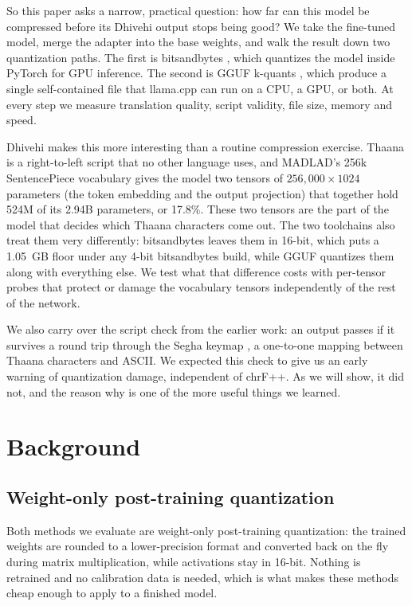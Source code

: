 \documentclass[10pt,twocolumn]{article}
\begin{document}
So this paper asks a narrow, practical question: how far can this model
be compressed before its Dhivehi output stops being good? We take the
fine-tuned model, merge the adapter into the base weights, and walk the
result down two quantization paths. The first is bitsandbytes
\citep{llmint8,qlora}, which quantizes the model inside PyTorch for GPU
inference. The second is GGUF k-quants \citep{llamacpp,kquants}, which
produce a single self-contained file that llama.cpp can run on a CPU, a
GPU, or both. At every step we measure translation quality, script
validity, file size, memory and speed.

Dhivehi makes this more interesting than a routine compression exercise.
Thaana is a right-to-left script that no other language uses, and
MADLAD's 256k SentencePiece vocabulary gives the model two tensors of
$256{,}000 \times 1024$ parameters (the token embedding and the output
projection) that together hold 524M of its 2.94B parameters, or 17.8\%.
These two tensors are the part of the model that decides which Thaana
characters come out. The two toolchains also treat them very
differently: bitsandbytes leaves them in 16-bit, which puts a 1.05~GB
floor under any 4-bit bitsandbytes build, while GGUF quantizes them along
with everything else. We test what that difference costs with per-tensor
probes that protect or damage the vocabulary tensors independently of the
rest of the network.

We also carry over the script check from the earlier work: an output
passes if it survives a round trip through the Segha keymap
\citep{divtransliteration}, a one-to-one mapping between Thaana
characters and ASCII. We expected this check to give us an early warning
of quantization damage, independent of chrF++. As we will show, it did
not, and the reason why is one of the more useful things we learned.

\section{Background}

\subsection{Weight-only post-training quantization}

Both methods we evaluate are weight-only post-training quantization: the
trained weights are rounded to a lower-precision format and converted
back on the fly during matrix multiplication, while activations stay in
16-bit. Nothing is retrained and no calibration data is needed, which is
what makes these methods cheap enough to apply to a finished model.
\end{document}
